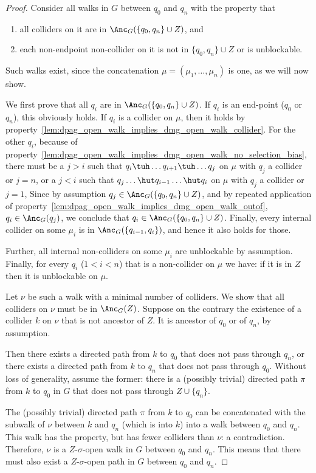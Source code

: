 \begin{proof}
  Consider all walks in $G$ between $q_0$ and $q_n$ with the property that 
  \begin{enumerate}
    \item all colliders on it are in $\Anc_{G}(\{q_0,q_n\} \cup Z)$, and 
    \item each non-endpoint non-collider on it is not in $\{q_0,q_n\} \cup Z$ or is unblockable.
  \end{enumerate}
  Such walks exist, since the concatenation $\mu = (\mu_1, \dots, \mu_n)$ is one, as we will now show. 

  We first prove that all $q_i$ are in $\Anc_{G}(\{q_0,q_n\} \cup Z)$. 
  If $q_i$ is an end-point ($q_0$ or $q_n$), this obviously holds.
  If $q_i$ is a collider on $\mu$, then it holds by property~\ref{lem:dpag_open_walk_implies_dmg_open_walk_collider}.
  For the other $q_i$, because of property~\ref{lem:dpag_open_walk_implies_dmg_open_walk_no_selection_bias},
  there must be a $j>i$ such that $q_i \tuh \dots q_{i+1} \tuh \dots q_j$ on $\mu$ with $q_j$ a collider or $j=n$, or a $j<i$ such that $q_j \dots \hut q_{i-1} \dots \hut q_i$ on $\mu$ with $q_j$ a collider or $j=1$,
  Since by assumption $q_j \in \Anc_G(\{q_0,q_n\} \cup Z)$, and by repeated application of property~\ref{lem:dpag_open_walk_implies_dmg_open_walk_outof}, $q_i \in \Anc_G(q_j)$, we conclude that $q_i \in \Anc_G(\{q_0,q_n\} \cup Z)$.
  Finally, every internal collider on some $\mu_i$ is in $\Anc_G(\{q_{i-1},q_i\})$, and hence it also holds for those.

  Further, all internal non-colliders on some $\mu_i$ are unblockable by assumption.
  Finally, for every $q_i$ ($1 < i < n$) that is a non-collider on $\mu$ we have: if it is in $Z$ then it is unblockable on $\mu$.

  Let $\nu$ be such a walk with a minimal number of colliders.
  We show that all colliders on $\nu$ must be in $\Anc_{G}(Z)$. 
  Suppose on the contrary the existence of a collider $k$ on $\nu$ that is not ancestor of $Z$. 
  It is ancestor of $q_0$ or of $q_n$, by assumption.

  Then there exists a directed path from $k$ to $q_0$ that does not pass through $q_n$, or there exists a directed path from $k$ to $q_n$ that does not pass through $q_0$.
  Without loss of generality, assume the former:
  there is a (possibly trivial) directed path $\pi$ from $k$ to $q_0$ in $G$ that does not pass through $Z \cup \{q_n\}$.
  
  The (possibly trivial) directed path $\pi$ from $k$ to $q_0$ can be concatenated with the subwalk of $\nu$ between $k$ and $q_n$ (which is into $k$) into a walk between $q_0$ and $q_n$.
  This walk has the property, but has fewer colliders than $\nu$: a contradiction.
  Therefore, $\nu$ is a $Z$-$\sigma$-open walk in $G$ between $q_0$ and $q_n$.
  This means that there must also exist a $Z$-$\sigma$-open path in $G$ between $q_0$ and $q_n$.
\end{proof}

